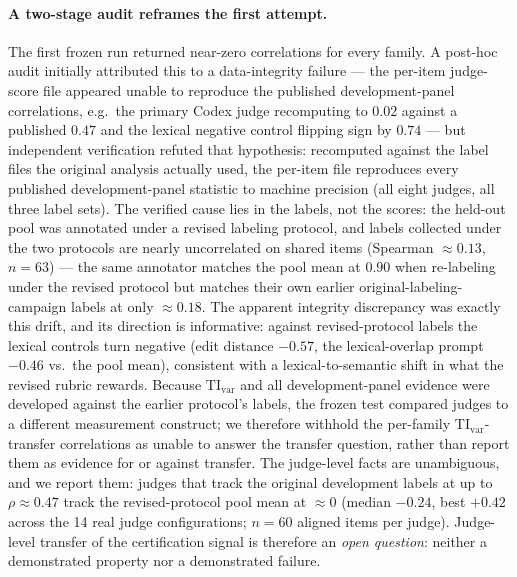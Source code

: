 \documentclass{article}
\begin{document}
\paragraph{A two-stage audit reframes the first attempt.}
The first frozen run returned near-zero correlations for every family.
A post-hoc audit initially attributed this to a data-integrity failure --- the per-item judge-score file appeared unable to reproduce the published development-panel correlations, e.g.\ the primary Codex judge recomputing to \(0.02\) against a published \(0.47\) and the lexical negative control flipping sign by \(0.74\) --- but independent verification refuted that hypothesis: recomputed against the label files the original analysis actually used, the per-item file reproduces every published development-panel statistic to machine precision (all eight judges, all three label sets).
The verified cause lies in the labels, not the scores: the held-out pool was annotated under a revised labeling protocol, and labels collected under the two protocols are nearly uncorrelated on shared items (Spearman \(\approx 0.13\), \(n{=}63\)) --- the same annotator matches the pool mean at \(0.90\) when re-labeling under the revised protocol but matches their own earlier original-labeling-campaign labels at only \(\approx 0.18\).
The apparent integrity discrepancy was exactly this drift, and its direction is informative: against revised-protocol labels the lexical controls turn negative (edit distance \(-0.57\), the lexical-overlap prompt \(-0.46\) vs.\ the pool mean), consistent with a lexical-to-semantic shift in what the revised rubric rewards.
Because \(\mathrm{TI}_{\mathrm{var}}\) and all development-panel evidence were developed against the earlier protocol's labels, the frozen test compared judges to a different measurement construct; we therefore withhold the per-family \(\mathrm{TI}_{\mathrm{var}}\)-transfer correlations as unable to answer the transfer question, rather than report them as evidence for or against transfer.
The judge-level facts are unambiguous, and we report them: judges that track the original development labels at up to \(\rho \approx 0.47\) track the revised-protocol pool mean at \(\approx 0\) (median \(-0.24\), best \(+0.42\) across the 14 real judge configurations; \(n{=}60\) aligned items per judge).
Judge-level transfer of the certification signal is therefore an \emph{open question}: neither a demonstrated property nor a demonstrated failure.
\end{document}

